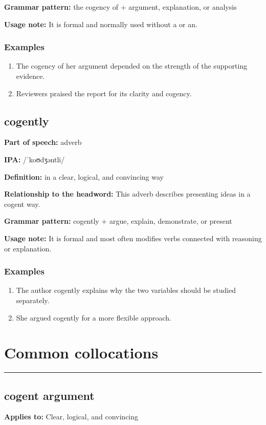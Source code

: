 \documentclass[11pt]{article}
\newcommand{\sectionrule}{\par\vspace{-0.5em}\noindent\textcolor{Accent}{\rule{\linewidth}{0.6pt}}\par}
\begin{document}
\textbf{Grammar pattern:} the cogency of + argument, explanation, or analysis

\textbf{Usage note:} It is formal and normally used without a or an.

\subsubsection{Examples}
\begin{enumerate}
  \item The cogency of her argument depended on the strength of the supporting evidence.
  \item Reviewers praised the report for its clarity and cogency.
\end{enumerate}

\subsection{cogently}
\textbf{Part of speech:} adverb

\textbf{IPA:} /ˈkoʊdʒəntli/

\textbf{Definition:} in a clear, logical, and convincing way

\textbf{Relationship to the headword:} This adverb describes presenting ideas in a cogent way.

\textbf{Grammar pattern:} cogently + argue, explain, demonstrate, or present

\textbf{Usage note:} It is formal and most often modifies verbs connected with reasoning or explanation.

\subsubsection{Examples}
\begin{enumerate}
  \item The author cogently explains why the two variables should be studied separately.
  \item She argued cogently for a more flexible approach.
\end{enumerate}

\section{Common collocations}
\sectionrule
\subsection{cogent argument}
\textbf{Applies to:} Clear, logical, and convincing
\end{document}
